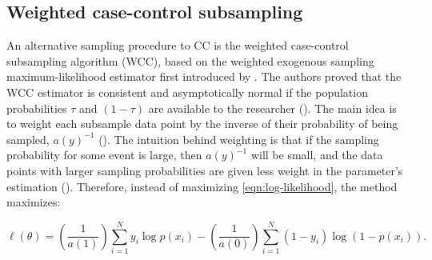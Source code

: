 \subsection{Weighted case-control subsampling}
\label{sec:wcc}


An alternative sampling procedure to CC is the weighted case-control subsampling algorithm (WCC), based on the weighted exogenous sampling maximum-likelihood estimator first introduced by \textcite{manski1977estimation}. The authors proved that the WCC estimator is consistent and asymptotically normal if the population probabilities $\tau$ and $(1-\tau)$ are available to the researcher (\cite{maalouf2011logistic}). The main idea is to weight each subsample data point by the inverse of their probability of being sampled, $a(y)^{-1}$ (\cite{hastie2014}). The intuition behind weighting is that if the sampling probability for some event is large, then $a(y)^{-1}$ will be small, and the data points with larger sampling probabilities are given less weight in the parameter's estimation (\cite{maalouf2011logistic}). Therefore, instead of maximizing \ref{eqn:log-likelihood}, the method maximizes:


\begin{equation}
    \ell(\theta) = \left( \frac{1}{a(1)} \right) \sum_{i=1}^N y_i \log p\left(x_i\right) - \left( \frac{1}{a(0)}\right)\sum_{i=1}^N \left(1-y_i\right) \log \left(1-p\left(x_i \right)\right)
    \label{eqn:w-log-likelihood}.
\end{equation}

